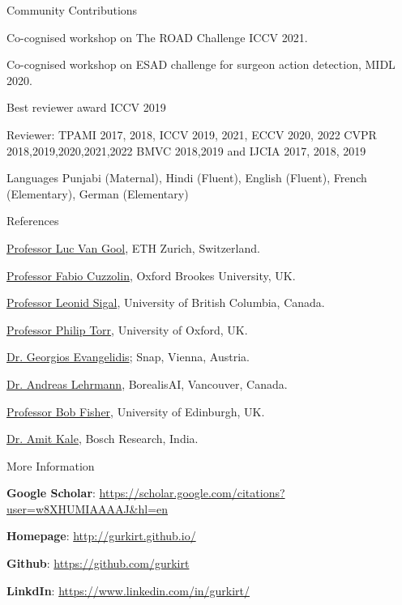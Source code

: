 \documentclass{resume} %
\begin{document}
\vspace{0.1in}
\begin{rSection}{Community Contributions}\itemsep -2pt
  \item Co-cognised workshop on The ROAD Challenge ICCV 2021.
  \item Co-cognised workshop on ESAD challenge for surgeon action detection, MIDL 2020.
  \item Best reviewer award ICCV 2019
  \item Reviewer: TPAMI 2017, 2018, ICCV 2019, 2021, ECCV 2020, 2022 CVPR 2018,2019,2020,2021,2022 BMVC 2018,2019 and IJCIA 2017, 2018, 2019
\end{rSection}

\vspace{0.1in}
\begin{rSection}{Languages}  \itemsep -2pt
  Punjabi (Maternal), Hindi (Fluent), English (Fluent), French (Elementary), German (Elementary)
\end{rSection}

\vspace{0.1in}
\begin{rSection}{References}  \itemsep -2pt
\item \href{https://ee.ethz.ch/the-department/faculty/professors/person-detail.OTAyMzM=.TGlzdC80MTEsMTA1ODA0MjU5.html}{Professor Luc Van Gool}, ETH Zurich, Switzerland.
\item \href{http://cms.brookes.ac.uk/staff/FabioCuzzolin/}{Professor Fabio Cuzzolin}, Oxford Brookes University, UK.
\item \href{https://www.cs.ubc.ca/~lsigal/}{Professor Leonid Sigal}, University of British Columbia, Canada.
\item \href{http://www.robots.ox.ac.uk/~phst/}{Professor Philip Torr}, University of Oxford, UK.
\item \href{https://team.inria.fr/perception/team-members/evangelidis/}{Dr. Georgios Evangelidis}; Snap, Vienna, Austria.
\item \href{https://ps.is.tuebingen.mpg.de/person/alehrmann}{Dr. Andreas Lehrmann}, BorealisAI, Vancouver, Canada.
\item \href{http://homepages.inf.ed.ac.uk/rbf/}{Professor Bob Fisher}, University of Edinburgh, UK.
\item \href{http://www.cfar.umd.edu/~kale/}{Dr. Amit Kale}, Bosch Research, India.
\end{rSection}

\vspace{0.1in}
\begin{rSection}{More Information}  \itemsep -2pt
  \item \textbf{Google Scholar}: \url{https://scholar.google.com/citations?user=w8XHUMIAAAAJ&hl=en}
  \item \textbf{Homepage}: \url{http://gurkirt.github.io/}
  \item \textbf{Github}: \url{https://github.com/gurkirt}
  \item \textbf{LinkdIn}: \url{https://www.linkedin.com/in/gurkirt/}
\end{rSection}
\end{document}
